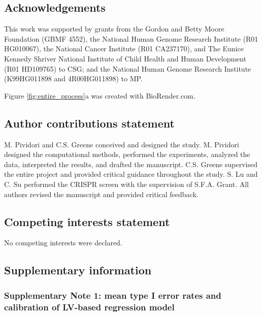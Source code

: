 \documentclass[
  a4paper,
]{article}
\begin{document}
\hypertarget{acknowledgements}{%
\subsection{Acknowledgements}\label{acknowledgements}}

This work was supported by grants from the Gordon and Betty Moore Foundation (GBMF 4552), the National Human Genome Research Institute (R01 HG010067), the National Cancer Institute (R01 CA237170), and The Eunice Kennedy Shriver National Institute of Child Health and Human Development (R01 HD109765) to CSG; and the National Human Genome Research Institute (K99HG011898 and 4R00HG011898) to MP.

Figure \ref{fig:entire_process}a was created with BioRender.com.

\hypertarget{author-contributions-statement}{%
\subsection{Author contributions statement}\label{author-contributions-statement}}

M. Pividori and C.S. Greene conceived and designed the study.
M. Pividori designed the computational methods, performed the experiments, analyzed the data, interpreted the results, and drafted the manuscript.
C.S. Greene supervised the entire project and provided critical guidance throughout the study.
S. Lu and C. Su performed the CRISPR screen with the supervision of S.F.A. Grant.
All authors revised the manuscript and provided critical feedback.

\hypertarget{competing-interests-statement}{%
\subsection{Competing interests statement}\label{competing-interests-statement}}

No competing interests were declared.

\clearpage

\hypertarget{supplementary-information}{%
\subsection{Supplementary information}\label{supplementary-information}}

\setcounter{figure}{0}

\hypertarget{sm:reg:null_sim}{%
\subsubsection{Supplementary Note 1: mean type I error rates and calibration of LV-based regression model}\label{sm:reg:null_sim}}
\end{document}
